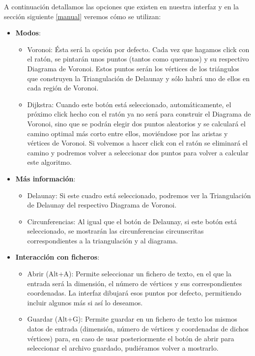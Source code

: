 A continuación detallamos las opciones que existen en nuestra interfaz y en la sección siguiente \ref{manual} veremos cómo se utilizan:
\begin{itemize}
        \item \textbf{Modos}:
            \begin{itemize}
                 \item Voronoi: Ésta será la opción por defecto. Cada vez que hagamos click con el ratón, se pintarán unos puntos (tantos como queramos) y su respectivo Diagrama de Voronoi. Estos puntos serán los vértices de los triángulos que construyen la Triangulación de Delaunay y sólo habrá uno de ellos en cada región de Voronoi.
                 \item Dijkstra: Cuando este botón está seleccionado, automáticamente, el próximo click hecho con el ratón ya no será para construir el Diagrama de Voronoi, sino que se podrán elegir dos puntos aleatorios y se calculará el camino optimal más corto entre ellos, moviéndose por las aristas y vértices de Voronoi. Si volvemos a hacer click con el ratón se eliminará el camino y podremos volver a seleccionar dos puntos para volver a calcular este algoritmo.
            \end{itemize}
        \item \textbf{Más información}:
            \begin{itemize}
                \item Delaunay: Si este cuadro está seleccionado, podremos ver la Triangulación de Delaunay del respectivo Diagrama de Voronoi.
                \item Circunferencias: Al igual que el botón de Delaunay, si este botón está seleccionado, se mostrarán las circunferencias circunscritas correspondientes a la triangulación y al diagrama.
            \end{itemize}
        \item \textbf{Interacción con ficheros}:
            \begin{itemize}
                \item Abrir (Alt+A): Permite seleccionar un fichero de texto, en el que la entrada será la dimensión, el número de vértices y sus correspondientes coordenadas. La interfaz dibujará esos puntos por defecto, permitiendo incluir algunos más si así lo deseamos. 
                \item Guardar (Alt+G): Permite guardar en un fichero de texto los mismos datos de entrada (dimensión, número de vértices y coordenadas de dichos vértices) para, en caso de usar posteriormente el botón de abrir para seleccionar el archivo guardado, pudiéramos volver a mostrarlo.

\end{itemize}
\end{itemize}
